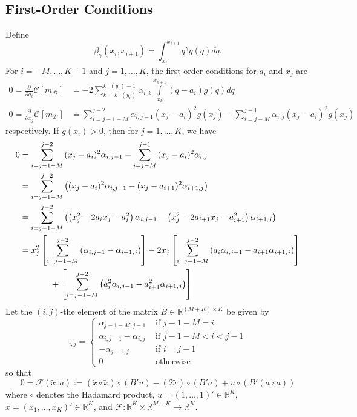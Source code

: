 \documentclass[12pt]{article}
\begin{document}
\subsection{First-Order Conditions}
Define
\begin{equation}
	\beta_{\gamma}(x_{i},x_{i+1})=\int_{x_{i}}^{x_{i+1}}{q^{\gamma}g(q)dq}.
\end{equation}
For $i=-M,\ldots,K-1$ and $j=1,\ldots,K$, the first-order conditions for $a_{i}$ and $x_{j}$ are 
\begin{align}
	0=\frac{\partial}{\partial a_{i}}\mathcal{C}[m_{\mathcal{D}}]&=-2\sum_{k=k_{-}(y_{i})}^{k_{+}(y_{i})-1}{\alpha_{i,k}\int\limits_{x_{k}}^{x_{k+1}}{(q-a_{i})g(q)dq}}\label{foc_a}\\
	0=\frac{\partial}{\partial x_{j}}\mathcal{C}[m_{\mathcal{D}}]&=\sum_{i=j-1-M}^{j-2}{\alpha_{i,j-1}(x_{j}-a_{i})^{2}g(x_{j})}-\sum_{i=j-M}^{j-1}{\alpha_{i,j}(x_{j}-a_{i})^{2}g(x_{j})}
\end{align}
respectively. If $g(x_{i})>0$, then for $j=1,\ldots,K$, we have
\begin{align}
	0&=\sum_{i=j-1-M}^{j-2}{(x_{j}-a_{i})^{2}}\alpha_{i,j-1}-\sum_{i=j-M}^{j-1}{(x_{j}-a_{i})^{2}\alpha_{i,j}}\\
	&=\sum_{i=j-1-M}^{j-2}{\left((x_{j}-a_{i})^{2}\alpha_{i,j-1}-(x_{j}-a_{i+1})^{2}\alpha_{i+1,j}\right)}\\
	&=\sum_{i=j-1-M}^{j-2}{\left(\left(x_{j}^{2}-2a_{i}x_{j}-a_{i}^{2}\right)\alpha_{i,j-1}-\left(x_{j}^{2}-2a_{i+1}x_{j}-a_{i+1}^{2}\right)\alpha_{i+1,j}\right)}\\
	&=x_{j}^{2}\left[\sum_{i=j-1-M}^{j-2}{(\alpha_{i,j-1}-\alpha_{i+1,j})}\right]-2x_{j}\left[\sum_{i=j-1-M}^{j-2}{\left(a_{i}\alpha_{i,j-1}-a_{i+1}\alpha_{i+1,j}\right)}\right]\notag\\
	&\hspace{.5in}+\left[\sum_{i=j-1-M}^{j-2}{\left(a_{i}^{2}\alpha_{i,j-1}-a_{i+1}^{2}\alpha_{i+1,j}\right)}\right]
\end{align}
Let the $(i,j)$-the element of the matrix $B\in\mathbb{R}^{(M+K)\times K}$ be given by
\begin{equation}
	[B]_{i,j}=
	\begin{cases}
		\alpha_{j-1-M,j-1} & \text{ if } j-1-M=i \\
		\alpha_{i,j-1}-\alpha_{i,j} & \text{ if } j-1-M<i<j-1 \\
		-\alpha_{j-1,j} & \text{ if } i=j-1 \\
		0 & \text{ otherwise }
	\end{cases}
\end{equation}
so that
\begin{equation}\label{eq:F_map}
	0=\mathcal{F}(\widetilde{x},a):=(\widetilde{x}\circ \widetilde{x})\circ(B'u)-(2\widetilde{x})\circ(B'a)+u\circ(B'(a\circ a))
\end{equation}
where $\circ$ denotes the Hadamard product, $u=(1,\ldots,1)'\in\mathbb{R}^{K}$, $\widetilde{x}=(x_{1},\ldots,x_{K})'\in\mathbb{R}^{K}$, and $\mathcal{F}:\mathbb{R}^{K}\times\mathbb{R}^{M+K}\rightarrow\mathbb{R}^{K}$.
\end{document}

